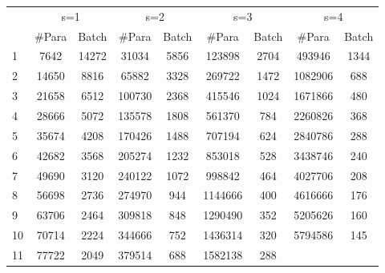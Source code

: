 \begin{table}[]
\begin{tabular}{c|c|c|c|c|c|c|c|c|}
\cline{2-9}
                         & \multicolumn{2}{c|}{s=1}  & \multicolumn{2}{c|}{s=2}  & \multicolumn{2}{c|}{s=3}  & \multicolumn{2}{c|}{s=4}  \\ \cline{1-1}
\multicolumn{1}{|l|}{}   & \#Para & Batch & \#Para & Batch & \#Para & Batch & \#Para & Batch \\ \hline
\multicolumn{1}{|l|}{1}  & 7642         & 14272      & 31034        & 5856       & 123898       & 2704       & 493946       & 1344       \\ \hline
\multicolumn{1}{|l|}{2}  & 14650        & 8816       & 65882        & 3328       & 269722       & 1472       & 1082906      & 688        \\ \hline
\multicolumn{1}{|l|}{3}  & 21658        & 6512       & 100730       & 2368       & 415546       & 1024       & 1671866      & 480        \\ \hline
\multicolumn{1}{|l|}{4}  & 28666        & 5072       & 135578       & 1808       & 561370       & 784        & 2260826      & 368        \\ \hline
\multicolumn{1}{|l|}{5}  & 35674        & 4208       & 170426       & 1488       & 707194       & 624        & 2840786      & 288        \\ \hline
\multicolumn{1}{|l|}{6}  & 42682        & 3568       & 205274       & 1232       & 853018       & 528        & 3438746      & 240        \\ \hline
\multicolumn{1}{|l|}{7}  & 49690        & 3120       & 240122       & 1072       & 998842       & 464        & 4027706      & 208        \\ \hline
\multicolumn{1}{|l|}{8}  & 56698        & 2736       & 274970       & 944        & 1144666      & 400        & 4616666      & 176        \\ \hline
\multicolumn{1}{|l|}{9}  & 63706        & 2464       & 309818       & 848        & 1290490      & 352        & 5205626      & 160        \\ \hline
\multicolumn{1}{|l|}{10} & 70714        & 2224       & 344666       & 752        & 1436314      & 320        & 5794586      & 145        \\ \hline
\multicolumn{1}{|l|}{11} & 77722        & 2049       & 379514       & 688        & 1582138      & 288        &              &            \\ \hline
\end{tabular}
\end{table}




